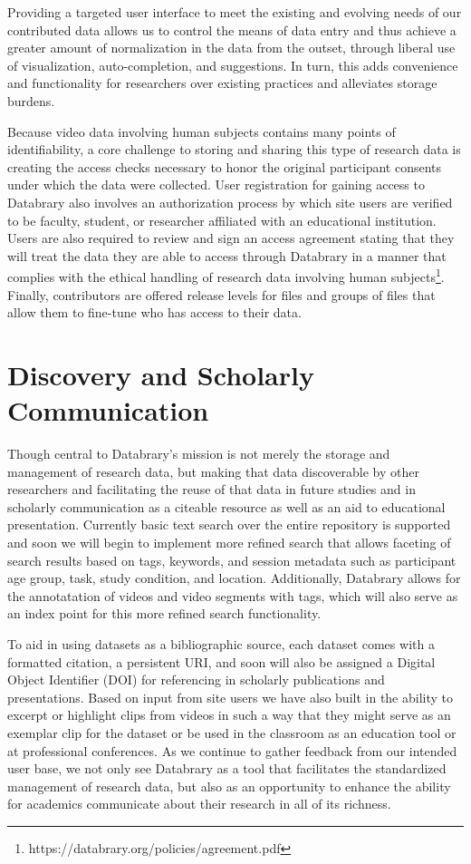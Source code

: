 \documentclass{sig-alternate}
\begin{document}
Providing a targeted user interface to meet the existing and evolving needs of our contributed data allows us to control the means of data entry and thus achieve a greater amount of normalization in the data from the outset, through liberal use of visualization, auto-completion, and suggestions.
In turn, this adds convenience and functionality for researchers over existing practices and alleviates storage burdens.

Because video data involving human subjects contains many points of identifiability, a core challenge to storing and sharing this type of research data is creating the access checks necessary to honor the original participant consents under which the data were collected. 
User registration for gaining access to Databrary also involves an authorization process by which site users are verified to be faculty, student, or researcher affiliated with an educational institution.
Users are also required to review and sign an access agreement stating that they will treat the data they are able to access through Databrary in a manner that complies with the ethical handling of research data involving human subjects\footnote{https://databrary.org/policies/agreement.pdf}.
Finally, contributors are offered release levels for files and groups of files that allow them to fine-tune who has access to their data. 

\section{Discovery and Scholarly Communication}

Though central to Databrary's mission is not merely the storage and management of research data, but making that data discoverable by other researchers and facilitating the reuse of that data in future studies and in scholarly communication as a citeable resource as well as an aid to educational presentation.
Currently basic text search over the entire repository is supported and soon we will begin to implement more refined search that allows faceting of search results based on tags, keywords, and session metadata such as participant age group, task, study condition, and location.
Additionally, Databrary allows for the annotatation of videos and video segments with tags, which will also serve as an index point for this more refined search functionality.  

To aid in using datasets as a bibliographic source, each dataset comes with a formatted citation, a persistent URI, and soon will also be assigned a Digital Object Identifier (DOI) for referencing in scholarly publications and presentations.
Based on input from site users we have also built in the ability to excerpt or highlight clips from videos in such a way that they might serve as an exemplar clip for the dataset or be used in the classroom as an education tool or at professional conferences.
As we continue to gather feedback from our intended user base, we not only see Databrary as a tool that facilitates the standardized management of research data, but also as an opportunity to enhance the ability for academics communicate about their research in all of its richness.
\end{document}

